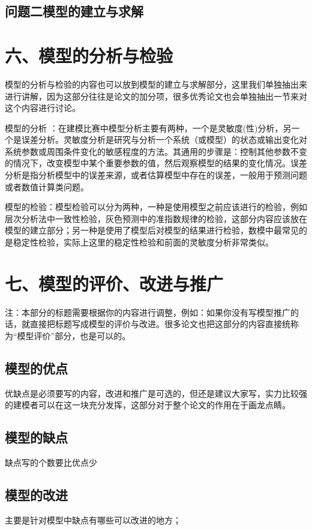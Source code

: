 \documentclass{my_paper}
\begin{document}
\subsection{问题二模型的建立与求解}



\section{六、模型的分析与检验}

模型的分析与检验的内容也可以放到模型的建立与求解部分，这里我们单独抽出来进行讲解，因为这部分往往是论文的加分项，很多优秀论文也会单独抽出一节来对这个内容进行讨论。

模型的分析 ：在建模比赛中模型分析主要有两种，一个是灵敏度(性)分析，另一个是误差分析。灵敏度分析是研究与分析一个系统（或模型）的状态或输出变化对系统参数或周围条件变化的敏感程度的方法。其通用的步骤是：控制其他参数不变的情况下，改变模型中某个重要参数的值，然后观察模型的结果的变化情况。误差分析是指分析模型中的误差来源，或者估算模型中存在的误差，一般用于预测问题或者数值计算类问题。

模型的检验：模型检验可以分为两种，一种是使用模型之前应该进行的检验，例如层次分析法中一致性检验，灰色预测中的准指数规律的检验，这部分内容应该放在模型的建立部分；另一种是使用了模型后对模型的结果进行检验，数模中最常见的是稳定性检验，实际上这里的稳定性检验和前面的灵敏度分析非常类似。

\section{七、模型的评价、改进与推广}
注：本部分的标题需要根据你的内容进行调整，例如：如果你没有写模型推广的话，就直接把标题写成模型的评价与改进。很多论文也把这部分的内容直接统称为“模型评价”部分，也是可以的。

\subsection{模型的优点}
优缺点是必须要写的内容，改进和推广是可选的，但还是建议大家写，实力比较强的建模者可以在这一块充分发挥，这部分对于整个论文的作用在于画龙点睛。
\subsection{模型的缺点}
缺点写的个数要比优点少
\subsection{模型的改进}
主要是针对模型中缺点有哪些可以改进的地方\cite{risken1996fokker}；
\end{document}
